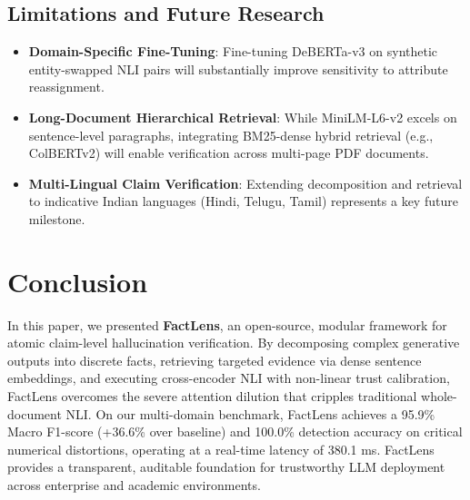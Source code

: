 \documentclass[conference]{IEEEtran}
\begin{document}
\subsection{Limitations and Future Research}
\begin{itemize}
    \item \textbf{Domain-Specific Fine-Tuning}: Fine-tuning DeBERTa-v3 on synthetic entity-swapped NLI pairs will substantially improve sensitivity to attribute reassignment.
    \item \textbf{Long-Document Hierarchical Retrieval}: While MiniLM-L6-v2 excels on sentence-level paragraphs, integrating BM25-dense hybrid retrieval (e.g., ColBERTv2) will enable verification across multi-page PDF documents.
    \item \textbf{Multi-Lingual Claim Verification}: Extending decomposition and retrieval to indicative Indian languages (Hindi, Telugu, Tamil) represents a key future milestone.
\end{itemize}

\section{Conclusion}
In this paper, we presented \textbf{FactLens}, an open-source, modular framework for atomic claim-level hallucination verification. By decomposing complex generative outputs into discrete facts, retrieving targeted evidence via dense sentence embeddings, and executing cross-encoder NLI with non-linear trust calibration, FactLens overcomes the severe attention dilution that cripples traditional whole-document NLI. On our multi-domain benchmark, FactLens achieves a 95.9\% Macro F1-score (+36.6\% over baseline) and 100.0\% detection accuracy on critical numerical distortions, operating at a real-time latency of 380.1 ms. FactLens provides a transparent, auditable foundation for trustworthy LLM deployment across enterprise and academic environments.
\end{document}
